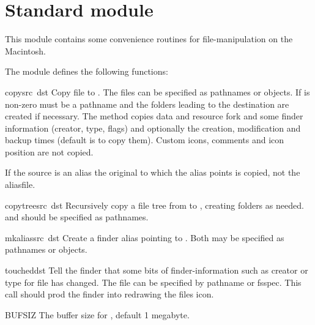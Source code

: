 
\section{Standard module }

This module contains some convenience routines for file-manipulation
on the Macintosh.

The  module defines the following functions:

\renewcommand{\indexsubitem}{(in module macostools)}

\begin{funcdesc}{copy}{src\, dst}
Copy file  to . The files can be specified as
pathnames or  objects. If  is non-zero
 must be a pathname and the folders leading to the
destination are created if necessary.  The method copies data and
resource fork and some finder information (creator, type, flags) and
optionally the creation, modification and backup times (default is to
copy them). Custom icons, comments and icon position are not copied.

If the source is an alias the original to which the alias points is
copied, not the aliasfile.
\end{funcdesc}

\begin{funcdesc}{copytree}{src\, dst}
Recursively copy a file tree from  to , creating
folders as needed.  and  should be specified as
pathnames.
\end{funcdesc}

\begin{funcdesc}{mkalias}{src\, dst}
Create a finder alias  pointing to . Both may be
specified as pathnames or  objects.
\end{funcdesc}

\begin{funcdesc}{touched}{dst}
Tell the finder that some bits of finder-information such as creator
or type for file  has changed. The file can be specified by
pathname or fsspec. This call should prod the finder into redrawing the
files icon.
\end{funcdesc}

\begin{datadesc}{BUFSIZ}
The buffer size for , default 1 megabyte.
\end{datadesc}


